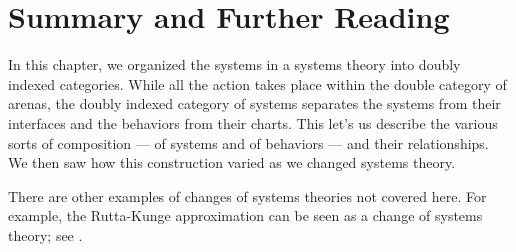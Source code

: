 \documentclass[DynamicalBook]{subfiles}
\begin{document}
\section{Summary and Further Reading}

In this chapter, we organized the systems in a systems theory into doubly indexed
categories. While all the action takes place within the double category of
arenas, the doubly indexed category of systems separates the systems from their
interfaces and the behaviors from their charts. This let's us describe the
various sorts of composition --- of systems and of behaviors --- and their
relationships. We then saw how this construction varied as we changed systems theory.

There are other examples of changes of systems theories not covered here. For example,
the Rutta-Kunge approximation can be seen as a change of systems theory; see \cite{ngotiaoco2017compositionality}.
\end{document}
